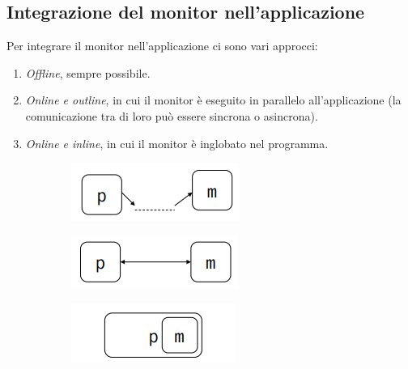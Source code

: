 \documentclass[a4paper,oneside,titlepage]{book}
\begin{document}
\subsection{Integrazione del monitor nell'applicazione}
Per integrare il monitor nell'applicazione ci sono vari approcci:
\begin{enumerate}[label=(\alph*)]
    \item \textit{Offline}, sempre possibile.
    \item \textit{Online e outline}, in cui il monitor è eseguito in parallelo all'applicazione (la comunicazione tra di loro può essere sincrona o asincrona).
    \item \textit{Online e inline}, in cui il monitor è inglobato nel programma.
\end{enumerate}
\begin{figure}[htp]
	\begin{subfigure}{0.3\textwidth}
        \centering
        \includegraphics[width=\textwidth, height=\textheight, keepaspectratio]{monInt1.png}
        \caption{}
    \end{subfigure}
    \hfill
    \begin{subfigure}{0.3\textwidth}
        \centering
        \includegraphics[width=\textwidth, height=\textheight, keepaspectratio]{monInt2.png}
        \caption{}
    \end{subfigure}
    \hfill
    \begin{subfigure}{0.3\textwidth}
        \centering
        \includegraphics[width=\textwidth, height=\textheight, keepaspectratio]{monInt3.png}
        \caption{}
    \end{subfigure}
\end{figure}
\end{document}
